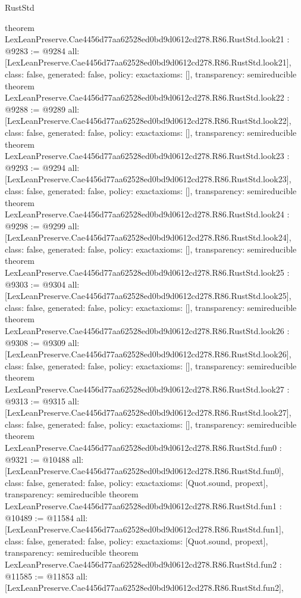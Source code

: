 \begin{lexlean}{RustStd}
\begin{coremodule}
{}
theorem LexLeanPreserve.Cae4456d77aa62528ed0bd9d0612cd278.R86.RustStd.look21 : @9283 := @9284 {
  all: [LexLeanPreserve.Cae4456d77aa62528ed0bd9d0612cd278.R86.RustStd.look21],
  class: false,
  generated: false,
  policy: exact{axioms: []},
  transparency: semireducible
}
theorem LexLeanPreserve.Cae4456d77aa62528ed0bd9d0612cd278.R86.RustStd.look22 : @9288 := @9289 {
  all: [LexLeanPreserve.Cae4456d77aa62528ed0bd9d0612cd278.R86.RustStd.look22],
  class: false,
  generated: false,
  policy: exact{axioms: []},
  transparency: semireducible
}
theorem LexLeanPreserve.Cae4456d77aa62528ed0bd9d0612cd278.R86.RustStd.look23 : @9293 := @9294 {
  all: [LexLeanPreserve.Cae4456d77aa62528ed0bd9d0612cd278.R86.RustStd.look23],
  class: false,
  generated: false,
  policy: exact{axioms: []},
  transparency: semireducible
}
theorem LexLeanPreserve.Cae4456d77aa62528ed0bd9d0612cd278.R86.RustStd.look24 : @9298 := @9299 {
  all: [LexLeanPreserve.Cae4456d77aa62528ed0bd9d0612cd278.R86.RustStd.look24],
  class: false,
  generated: false,
  policy: exact{axioms: []},
  transparency: semireducible
}
theorem LexLeanPreserve.Cae4456d77aa62528ed0bd9d0612cd278.R86.RustStd.look25 : @9303 := @9304 {
  all: [LexLeanPreserve.Cae4456d77aa62528ed0bd9d0612cd278.R86.RustStd.look25],
  class: false,
  generated: false,
  policy: exact{axioms: []},
  transparency: semireducible
}
theorem LexLeanPreserve.Cae4456d77aa62528ed0bd9d0612cd278.R86.RustStd.look26 : @9308 := @9309 {
  all: [LexLeanPreserve.Cae4456d77aa62528ed0bd9d0612cd278.R86.RustStd.look26],
  class: false,
  generated: false,
  policy: exact{axioms: []},
  transparency: semireducible
}
theorem LexLeanPreserve.Cae4456d77aa62528ed0bd9d0612cd278.R86.RustStd.look27 : @9313 := @9315 {
  all: [LexLeanPreserve.Cae4456d77aa62528ed0bd9d0612cd278.R86.RustStd.look27],
  class: false,
  generated: false,
  policy: exact{axioms: []},
  transparency: semireducible
}
theorem LexLeanPreserve.Cae4456d77aa62528ed0bd9d0612cd278.R86.RustStd.fun0 : @9321 := @10488 {
  all: [LexLeanPreserve.Cae4456d77aa62528ed0bd9d0612cd278.R86.RustStd.fun0],
  class: false,
  generated: false,
  policy: exact{axioms: [Quot.sound, propext]},
  transparency: semireducible
}
theorem LexLeanPreserve.Cae4456d77aa62528ed0bd9d0612cd278.R86.RustStd.fun1 : @10489 := @11584 {
  all: [LexLeanPreserve.Cae4456d77aa62528ed0bd9d0612cd278.R86.RustStd.fun1],
  class: false,
  generated: false,
  policy: exact{axioms: [Quot.sound, propext]},
  transparency: semireducible
}
theorem LexLeanPreserve.Cae4456d77aa62528ed0bd9d0612cd278.R86.RustStd.fun2 : @11585 := @11853 {
  all: [LexLeanPreserve.Cae4456d77aa62528ed0bd9d0612cd278.R86.RustStd.fun2],
}
\end{coremodule}
\end{lexlean}

